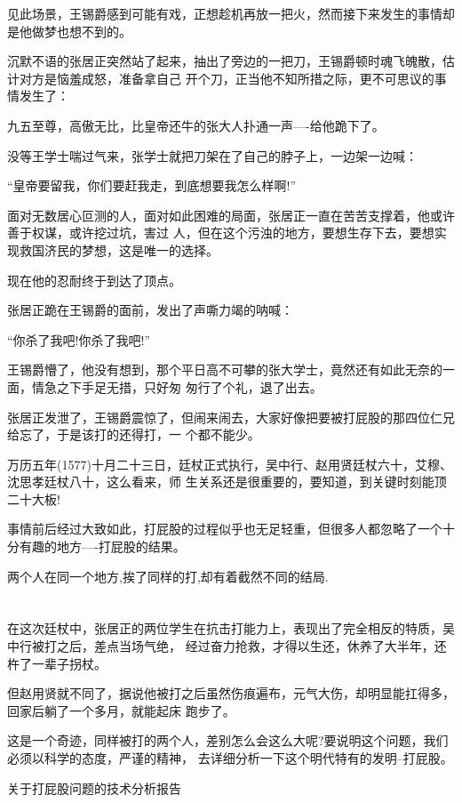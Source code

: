 \documentclass[11pt,a4paper,onecolumn]{article}
\begin{document}
见此场景，王锡爵感到可能有戏，正想趁机再放一把火，然而接下来发生的事情却是他做梦也想不到的。

沉默不语的张居正突然站了起来，抽出了旁边的一把刀，王锡爵顿时魂飞魄散，估计对方是恼羞成怒，准备拿自己
开个刀，正当他不知所措之际，更不可思议的事情发生了：

九五至尊，高傲无比，比皇帝还牛的张大人扑通一声----给他跪下了。

没等王学士喘过气来，张学士就把刀架在了自己的脖子上，一边架一边喊：

``皇帝要留我，你们要赶我走，到底想要我怎么样啊!''

面对无数居心叵测的人，面对如此困难的局面，张居正一直在苦苦支撑着，他或许善于权谋，或许挖过坑，害过
人，但在这个污浊的地方，要想生存下去，要想实现救国济民的梦想，这是唯一的选择。

现在他的忍耐终于到达了顶点。

张居正跪在王锡爵的面前，发出了声嘶力竭的呐喊：

``你杀了我吧!你杀了我吧!''

王锡爵懵了，他没有想到，那个平日高不可攀的张大学士，竟然还有如此无奈的一面，情急之下手足无措，只好匆
匆行了个礼，退了出去。

张居正发泄了，王锡爵震惊了，但闹来闹去，大家好像把要被打屁股的那四位仁兄给忘了，于是该打的还得打，一
个都不能少。

万历五年(1577)十月二十三日，廷杖正式执行，吴中行、赵用贤廷杖六十，艾穆、沈思孝廷杖八十，这么看来，师
生关系还是很重要的，要知道，到关键时刻能顶二十大板!

事情前后经过大致如此，打屁股的过程似乎也无足轻重，但很多人都忽略了一个十分有趣的地方----打屁股的结果。

两个人在同一个地方,挨了同样的打,却有着截然不同的结局.

\section[\thesection]{}

在这次廷杖中，张居正的两位学生在抗击打能力上，表现出了完全相反的特质，吴中行被打之后，差点当场气绝，
经过奋力抢救，才得以生还，休养了大半年，还杵了一辈子拐杖。

但赵用贤就不同了，据说他被打之后虽然伤痕遍布，元气大伤，却明显能扛得多，回家后躺了一个多月，就能起床
跑步了。

这是一个奇迹，同样被打的两个人，差别怎么会这么大呢?要说明这个问题，我们必须以科学的态度，严谨的精神，
去详细分析一下这个明代特有的发明--打屁股。

关于打屁股问题的技术分析报告
\end{document}
